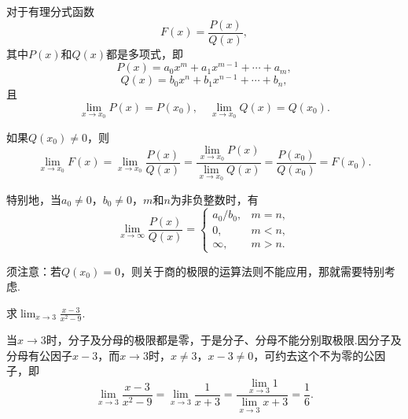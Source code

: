 \begin{example}
对于有理分式函数\[
F(x) = \frac{P(x)}{Q(x)},
\]其中\(P(x)\)和\(Q(x)\)都是多项式，即\[
P(x) = a_0 x^m + a_1 x^{m-1} + \dotsb + a_m,
\]\[
Q(x) = b_0 x^n + b_1 x^{n-1} + \dotsb + b_n,
\]且\[
\lim_{x \to x_0} P(x) = P(x_0),
\quad
\lim_{x \to x_0} Q(x) = Q(x_0).
\]

如果\(Q(x_0) \neq 0\)，则\[
\lim_{x \to x_0} F(x)
= \lim_{x \to x_0} \frac{P(x)}{Q(x)}
= \frac{\lim_{x \to x_0} P(x)}{\lim_{x \to x_0} Q(x)}
= \frac{P(x_0)}{Q(x_0)}
= F(x_0).
\]

特别地，当\(a_0\neq0\)，\(b_0\neq0\)，\(m\)和\(n\)为非负整数时，有
\[
\lim_{x\to\infty}\frac{P(x)}{Q(x)} = \left\{ \begin{array}{cl}
a_0/b_0, & m=n, \\
0, & m<n, \\
\infty, & m>n.
\end{array} \right.
\]
\end{example}
须注意：若\(Q(x_0) = 0\)，则关于商的极限的运算法则不能应用，那就需要特别考虑.

\begin{example}
求\(\lim_{x \to 3}\frac{x-3}{x^2-9}\).
\begin{solution}
当\(x \to 3\)时，分子及分母的极限都是零，于是分子、分母不能分别取极限.因分子及分母有公因子\(x - 3\)，而\(x \to 3\)时，\(x \neq 3\)，\(x - 3 \neq 0\)，可约去这个不为零的公因子，即\[
\lim_{x \to 3}\frac{x - 3}{x^2 - 9}
= \lim_{x \to 3}\frac{1}{x + 3}
= \frac{\lim_{x \to 3} 1}{\lim_{x \to 3} x+3}
= \frac{1}{6}.
\]
\end{solution}
\end{example}

